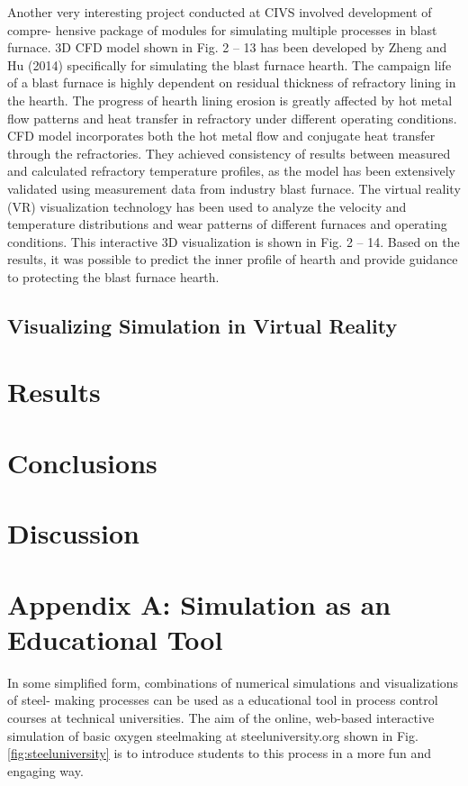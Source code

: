 Another very interesting project conducted at CIVS involved development of compre- hensive package of modules for simulating multiple processes in blast furnace. 3D CFD model shown in Fig. 2 – 13 has been developed by Zheng and Hu (2014) specifically for simulating the blast furnace hearth. The campaign life of a blast furnace is highly dependent on residual thickness of refractory lining in the hearth. The progress of hearth lining erosion is greatly affected by hot metal flow patterns and heat transfer in refractory under different operating conditions. CFD model incorporates both the hot metal flow and conjugate heat transfer through the refractories. They achieved consistency of results between measured and calculated refractory temperature profiles, as the model has been extensively validated using measurement data from industry blast furnace. The virtual reality (VR) visualization technology has been used to analyze the velocity and temperature distributions and wear patterns of different furnaces and operating conditions. This interactive 3D visualization is shown in Fig. 2 – 14. Based on the results, it was possible to predict the inner profile of hearth and provide guidance to protecting the blast furnace hearth.

\subsection{Visualizing Simulation in Virtual Reality}

\section{Results}

\section{Conclusions}

\section{Discussion}

\section{Appendix A: Simulation as an Educational Tool}

In some simplified form, combinations of numerical simulations and visualizations of steel- making processes can be used as a educational tool in process control courses at technical universities. The aim of the online, web-based interactive simulation of basic oxygen steelmaking at steeluniversity.org shown in Fig. \ref{fig:steeluniversity} is to introduce students to this process in a more fun and engaging way.

